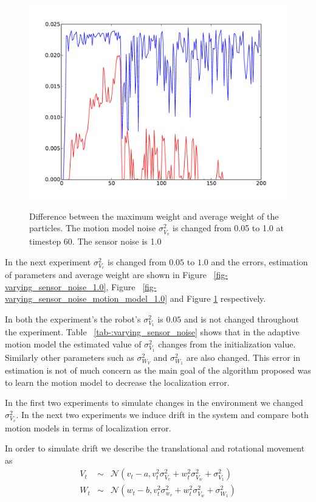 \documentclass[12pt]{dalcsthesis}
\begin{document}
\begin{figure}[!h]
  \centering
     {\includegraphics[height = 3.0 in]{./plots/200_005_10_s_10_max_weight.pdf}}
  \caption{\label{fig-varying_sensor_noise_sensor_model_1.0_max_weight} Difference between the maximum weight and average weight of the particles. The motion model noise $\sigma_{V_{v}}^{2}$ is changed from 0.05 to 1.0 at timestep 60. The sensor noise is 1.0}
\end{figure}

In the next experiment $\sigma_{V_{v}}^2$ is changed from $0.05$ to $1.0$ and the errors, estimation of parameters and average weight are shown in Figure ~\ref{fig-varying_sensor_noise_1.0}, Figure ~\ref{fig-varying_sensor_noise_motion_model_1.0} and Figure \ref{fig-varying_sensor_noise_sensor_model_1.0_max_weight} respectively. 

In both the experiment's the robot's $\sigma_{V_{1}}^2$ is $0.05$ and is not changed throughout the experiment. Table ~\ref{tab-:varying_sensor_noise} shows that in the adaptive motion model the estimated value of $\sigma_{V_{1}}^2$ changes from the initialization value. Similarly other parameters such as $\sigma_{W_{V}}^2$ and $\sigma_{W_{1}}^2$ are also changed. This error in estimation is not of much concern as the main goal of the algorithm proposed was to learn the motion model to decrease the localization error. 
  
In the first two experiments to simulate changes in the environment we changed $\sigma_{V_{v}}^2$. In the next two experiments we induce drift in the system and compare both motion models in terms of localization error.

In order to simulate drift we describe the translational and rotational movement as
\begin{eqnarray}
\label{eq- drift subtract}
V_{t}&\sim&\mathcal{{N}}(v_{t}-a,v_{t}^{2}\sigma_{V_{v}}^{2}+w_{t}^{2}\sigma_{V_{w}}^{2}+\sigma_{V_{1}}^{2}) \\
W_{t}&\sim&\mathcal{{N}}(w_{t}-b,v_{t}^{2}\sigma_{w_{v}}^{2}+w_{t}^{2}\sigma_{V_{w}}^{2}+\sigma_{W_{1}}^{2})
\end{eqnarray}
\end{document}
